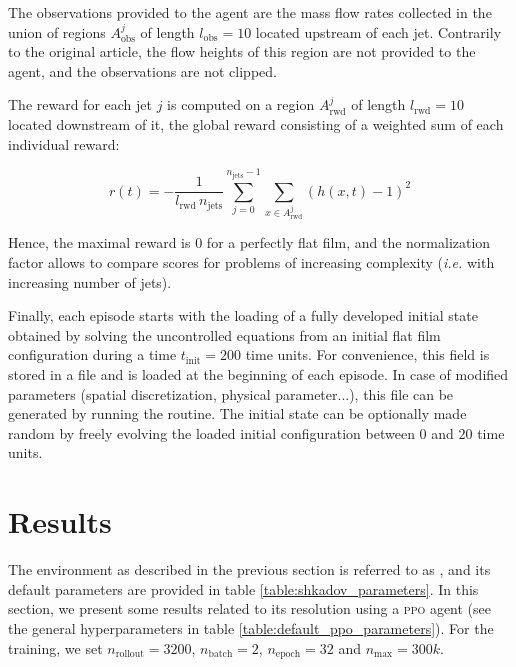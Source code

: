 The observations provided to the agent are the mass flow rates collected in the union of regions $A^j_\text{obs}$ of length $l_\text{obs} = 10$ located upstream of each jet. Contrarily to the original article, the flow heights of this region are not provided to the agent, and the observations are not clipped.

The reward for each jet $j$ is computed on a region $A^j_\text{rwd}$ of length $l_\text{rwd} = 10$ located downstream of it, the global reward consisting of a weighted sum of each individual reward:

\begin{equation}
\label{eq:shkadov_reward}
	r(t) = - \frac{1}{l_\text{rwd} \, n_\text{jets}} \sum_{j=0}^{n_\text{jets}-1} \sum_{x \in A^j_\text{rwd}} (h(x,t) - 1)^2
\end{equation}

Hence, the maximal reward is $0$ for a perfectly flat film, and the normalization factor allows to compare scores for problems of increasing complexity (\textit{i.e.} with increasing number of jets).

Finally, each episode starts with the loading of a fully developed initial state obtained by solving the uncontrolled equations from an initial flat film configuration during a time $t_\text{init} = 200$ time units. For convenience, this field is stored in a file and is loaded at the beginning of each episode. In case of modified parameters (spatial discretization, physical parameter...), this file can be generated by running the  routine. The initial state can be optionally made random by freely evolving the loaded initial configuration between $0$ and $20$ time units.

\section{Results}

The environment as described in the previous section is referred to as , and its default parameters are provided in table \ref{table:shkadov_parameters}. In this section, we present some results related to its resolution using a \textsc{ppo} agent (see the general hyperparameters in table \ref{table:default_ppo_parameters}). For the training, we set $n_\text{rollout} = 3200$, $n_\text{batch} = 2$, $n_\text{epoch} = 32$ and $n_\text{max} = 300k$.

